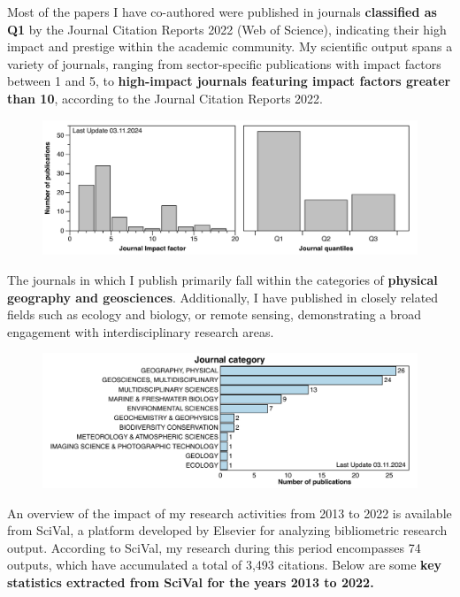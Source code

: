 \documentclass[11pt]{article}
\begin{document}
\newpage

{\normalfont Most of the papers I have co-authored were published in journals \textbf{classified as Q1} by the Journal Citation Reports 2022 (Web of Science), indicating their high impact and prestige within the academic community. My scientific output spans a variety of journals, ranging from sector-specific publications with impact factors between 1 and 5, to \textbf{high-impact journals featuring impact factors greater than 10}, according to the Journal Citation Reports 2022.}

\begin{figure}[h]
\centering
\includegraphics[width=\textwidth]{img/Quantiles.pdf}
\end{figure}

{\normalfont The journals in which I publish primarily fall within the categories of \textbf{physical geography and geosciences}. Additionally, I have published in closely related fields such as ecology and biology, or remote sensing, demonstrating a broad engagement with interdisciplinary research areas.}

\begin{figure}[h]
\centering
\includegraphics[width=\textwidth]{img/topics.pdf}
\end{figure}
\newpage
{\normalfont An overview of the impact of my research activities from 2013 to 2022 is available from SciVal, a platform developed by Elsevier for analyzing bibliometric research output. According to SciVal, my research during this period encompasses 74 outputs, which have accumulated a total of 3,493 citations. Below are some \textbf{key statistics extracted from SciVal for the years 2013 to 2022.}}
\smallskip
\end{document}
